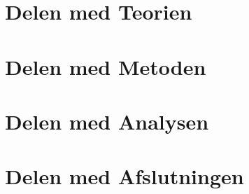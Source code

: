 

	


	\part{Delen med Teorien \label{part_teori}}



	\part{Delen med Metoden \label{part_metode}}
		 

		 	




	\part{Delen med Analysen \label{part_analyse}}

				


\part{Delen med Afslutningen \label{part_afslutning}}



